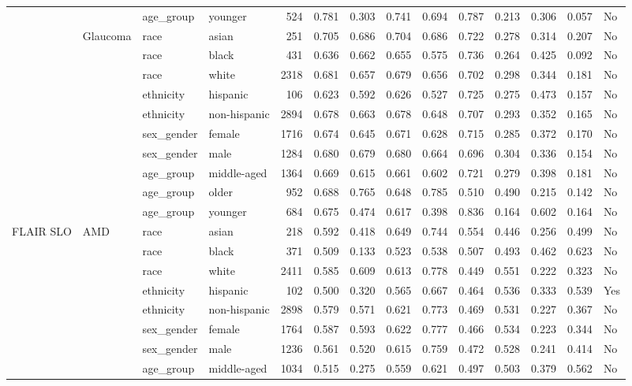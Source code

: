 \begin{longtable}{@{}lll l rrrrrrrr@{}}
 &  & age\_group & younger & 524 & 0.781 & 0.303 & 0.741 & 0.694 & 0.787 & 0.213 & 0.306 & 0.057 & No \\
 & Glaucoma & race & asian & 251 & 0.705 & 0.686 & 0.704 & 0.686 & 0.722 & 0.278 & 0.314 & 0.207 & No \\
 &  & race & black & 431 & 0.636 & 0.662 & 0.655 & 0.575 & 0.736 & 0.264 & 0.425 & 0.092 & No \\
 &  & race & white & 2318 & 0.681 & 0.657 & 0.679 & 0.656 & 0.702 & 0.298 & 0.344 & 0.181 & No \\
 &  & ethnicity & hispanic & 106 & 0.623 & 0.592 & 0.626 & 0.527 & 0.725 & 0.275 & 0.473 & 0.157 & No \\
 &  & ethnicity & non-hispanic & 2894 & 0.678 & 0.663 & 0.678 & 0.648 & 0.707 & 0.293 & 0.352 & 0.165 & No \\
 &  & sex\_gender & female & 1716 & 0.674 & 0.645 & 0.671 & 0.628 & 0.715 & 0.285 & 0.372 & 0.170 & No \\
 &  & sex\_gender & male & 1284 & 0.680 & 0.679 & 0.680 & 0.664 & 0.696 & 0.304 & 0.336 & 0.154 & No \\
 &  & age\_group & middle-aged & 1364 & 0.669 & 0.615 & 0.661 & 0.602 & 0.721 & 0.279 & 0.398 & 0.181 & No \\
 &  & age\_group & older & 952 & 0.688 & 0.765 & 0.648 & 0.785 & 0.510 & 0.490 & 0.215 & 0.142 & No \\
 &  & age\_group & younger & 684 & 0.675 & 0.474 & 0.617 & 0.398 & 0.836 & 0.164 & 0.602 & 0.164 & No \\
FLAIR SLO & AMD & race & asian & 218 & 0.592 & 0.418 & 0.649 & 0.744 & 0.554 & 0.446 & 0.256 & 0.499 & No \\
 &  & race & black & 371 & 0.509 & 0.133 & 0.523 & 0.538 & 0.507 & 0.493 & 0.462 & 0.623 & No \\
 &  & race & white & 2411 & 0.585 & 0.609 & 0.613 & 0.778 & 0.449 & 0.551 & 0.222 & 0.323 & No \\
 &  & ethnicity & hispanic & 102 & 0.500 & 0.320 & 0.565 & 0.667 & 0.464 & 0.536 & 0.333 & 0.539 & Yes \\
 &  & ethnicity & non-hispanic & 2898 & 0.579 & 0.571 & 0.621 & 0.773 & 0.469 & 0.531 & 0.227 & 0.367 & No \\
 &  & sex\_gender & female & 1764 & 0.587 & 0.593 & 0.622 & 0.777 & 0.466 & 0.534 & 0.223 & 0.344 & No \\
 &  & sex\_gender & male & 1236 & 0.561 & 0.520 & 0.615 & 0.759 & 0.472 & 0.528 & 0.241 & 0.414 & No \\
 &  & age\_group & middle-aged & 1034 & 0.515 & 0.275 & 0.559 & 0.621 & 0.497 & 0.503 & 0.379 & 0.562 & No \\

\end{longtable}
